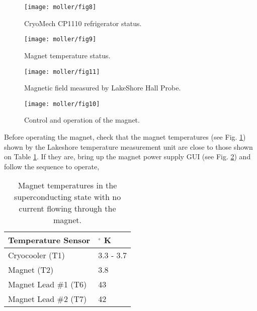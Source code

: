 {\begin{figure}
\begin{minipage}[c]{0.4\linewidth}
\texttt{[image: moller/fig8]}
\caption[CP1110 status]{CryoMech CP1110 refrigerator status.}
\label{fig:cryomech_status} 
\end{minipage}
\hfill
\begin{minipage}[c]{0.4\linewidth}
\texttt{[image: moller/fig9]}
\caption[Temperature status]{Magnet temperature status.}
 \label{fig:temperature_status} 
\end{minipage}%
\end{figure}

\begin{figure}
\begin{minipage}[c]{0.4\linewidth}
\texttt{[image: moller/fig11]}
\caption[gaussmeter_reading]{Magnetic field measured by LakeShore Hall Probe.}
\label{fig:gaussmeter} 
\end{minipage}
\hfill
\begin{minipage}[c]{0.4\linewidth}
\texttt{[image: moller/fig10]}
\caption[Moller magnet supply]{Control and operation of the magnet.}
 \label{fig:power_control} 
\end{minipage}%
\end{figure}

Before operating the magnet, check that the magnet temperatures (see Fig. \ref{fig:temperature_status}) shown by the Lakeshore temperature measurement unit are close to those shown on Table \ref{temperature_start}.
If they are, bring up the magnet power supply GUI (see Fig. \ref{fig:power_control}) and follow the sequence to operate,
\begin{table}[htb]
\begin{center}
\begin{tabular}{| p{6cm} | p{2cm} |} \hline
Temperature Sensor   & \hfill $^\circ$ K \\
\hline 
  Cryocooler (T1)   &  \hfill  3.3 - 3.7 \\
  Magnet (T2) & \hfill 3.8 \\
  Magnet Lead \#1 (T6)  &  \hfill 43   \\
  Magnet Lead \#2 (T7)  &   \hfill 42   \\
\hline
\end{tabular}
\end{center}
\caption[Magnet temperatures in the superconducting state]{Magnet temperatures in the superconducting state with no current flowing through the magnet.}
\label{temperature_start}
\end{table}

}

